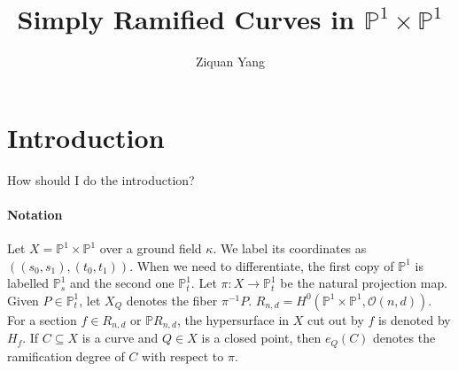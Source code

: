 \documentclass[12pt]{article}
\theoremstyle{plain}
\theoremstyle{definition}
\newcommand{\IP}{\mathbb{P}}
\newcommand{\sO}{\mathcal{O}}
\newcommand{\<}{\langle}
\renewcommand{\>}{\rangle}
\begin{document}
%

\title{Simply Ramified Curves in $\IP^1 \times \IP^1$}
\author{Ziquan Yang}


\date{}

\maketitle

 

\setcounter{section}{0}
\section{Introduction}
How should I do the introduction?
\paragraph{Notation} 
Let $X = \IP^1 \times \IP^1$ over a ground field $\kappa$. We label its coordinates as $((s_0, s_1), (t_0, t_1))$. When we need to differentiate, the first copy of $\IP^1$ is labelled $\IP^1_s$ and the second one $\IP^1_t$. Let $\pi : X \to \IP^1_t$ be the natural projection map. Given $P \in \IP^1_t$, let $X_Q$ denotes the fiber $\pi^{-1} P$. $R_{n, d} = H^0(\IP^1 \times \IP^1, \sO(n, d))$. For a section $f \in R_{n, d}$ or $\IP R_{n, d}$, the hypersurface in $X$ cut out by $f$ is denoted by $H_f$. If $C \subseteq X$ is a curve and $Q \in X$ is a closed point, then $e_Q(C)$ denotes the ramification degree of $C$ with respect to $\pi$. 
\end{document}
